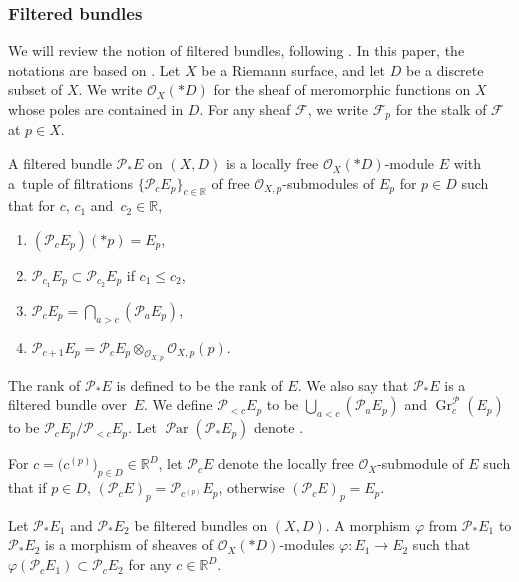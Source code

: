 \documentclass[10pt,a4paper]{amsart}
\numberwithin{equation}{section}
\newcommand{\R}{\mathbb{R}}
\newcommand{\strsheaf}{\mathcal{O}}
\newcommand{\gr}{\operatorname{\mathrm{Gr}}}
\newcommand{\pa}{\operatorname{\mathcal{P}ar}}
\begin{document}
\subsubsection{Filtered bundles}
We will review the notion of filtered bundles, following \cite{Mo1,Si1,Si2}. In this paper, the notations are based on \cite{LM1}.
Let $X$ be a Riemann surface, and let $D$ be a discrete subset of $X$. We write $\mathcal{O}_{X}(*D)$ for the sheaf of meromorphic functions on $X$ whose poles are contained in $D$. For any sheaf $\mathcal{F}$, we write $\mathcal{F}_p$ for the stalk of $\mathcal{F}$ at $p\in X$.
\begin{Definition}
 A filtered bundle $\mathcal{P}_* E$ on $(X,D)$ is a locally free $\mathcal{O}_{X}(*D)$-module $E$ with a~tuple of filtrations $\{\mathcal{P}_{c} E_p\}_{c\in \R}$ of free $\strsheaf_{X,p}$-submodules of $E_p$ for $p\in D$ such that for $c$, $c_1$ and~$c_2\in \R$,
 \begin{enumerate}\itemsep=0pt
 \item[1)] $(\mathcal{P}_{c} E_p)(*p) = E_p$,
 \item[2)] $\mathcal{P}_{c_1} E_p \subset \mathcal{P}_{c_2} E_p$ if $c_1 \leq c_2$,
 \item[3)] $\mathcal{P}_{c} E_p =\bigcap_{a>c} (\mathcal{P}_{a} E_p)$,
 \item[4)] $\mathcal{P}_{c+1} E_p = \mathcal{P}_{c} E_p \otimes_{\mathcal{O}_{X,p}} \mathcal{O}_{X,p}(p)$.
 \end{enumerate}
 The rank of $\mathcal{P}_* E$ is defined to be the rank of $E$. We also say that $\mathcal{P}_* E$ is a filtered bundle over~$E$.
 We define $\mathcal{P}_{<c} E_p$ to be $\bigcup_{a<c} (\mathcal{P}_a E_p)$ and $\gr^{\mathcal{P}}_{c} (E_p)$ to be $\mathcal{P}_{c} E_p /\mathcal{P}_{<c} E_p$. Let $\pa(\mathcal{P}_{*} E_p)$ denote \smash{$\bigl\{c\in\R \mid \gr^{\mathcal{P}}_{c} (E_p)\neq 0\bigr\}$}.
\end{Definition}
For $c=\bigl(c^{(p)}\bigr)_{p\in D} \in \R^{D}$, let $\mathcal{P}_{c} E$ denote the locally free $\strsheaf_{X}$-submodule of $E$ such that if $p\in D$, $(\mathcal{P}_{c} E)_{p} = \mathcal{P}_{c^{(p)}} E_p$, otherwise $(\mathcal{P}_{c} E)_{p} = E_p$.
\begin{Definition}
 Let $\mathcal{P}_* E_1$ and $\mathcal{P}_* E_2$ be filtered bundles on $(X,D)$. A morphism $\varphi$ from $\mathcal{P}_* E_1$ to $\mathcal{P}_* E_2$ is a morphism of sheaves of $\mathcal{O}_{X}(*D)$-modules $\varphi\colon E_1\to E_2$ such that $\varphi(\mathcal{P}_{c} E_{1}) \subset \mathcal{P}_{c} E_{2}$ for any $c\in \R^{D}$.
\end{Definition}
\end{document}
